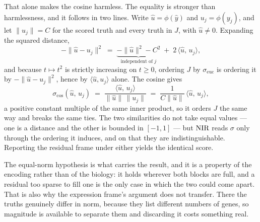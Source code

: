 That alone makes the cosine harmless. The equality is stronger than harmlessness,
and it follows in two lines. Write $\hat{u} = \phi(\hat{y})$ and $u_j =
\phi(y_j)$, and let $\lVert u_j \rVert = C$ for the scored truth and every truth
in $J$, with $\hat{u} \neq 0$. Expanding the squared distance,
\begin{equation}
 -\lVert \hat{u} - u_j \rVert^{2}
 \;=\; \underbrace{-\lVert \hat{u} \rVert^{2} - C^{2}}_{\text{independent of } j}
 \;+\; 2\,\langle \hat{u},\, u_j \rangle ,
\end{equation}
and because $t \mapsto t^{2}$ is strictly increasing on $t \geq 0$, ordering $J$
by $\sigma_{\mathrm{euc}}$ is ordering it by $-\lVert \hat{u} - u_j \rVert^{2}$,
hence by $\langle \hat{u}, u_j \rangle$ alone. The cosine gives
\begin{equation}
 \sigma_{\cos}(\hat{u},\, u_j)
 \;=\; \frac{\langle \hat{u},\, u_j \rangle}
            {\lVert \hat{u} \rVert \, \lVert u_j \rVert}
 \;=\; \frac{1}{C \lVert \hat{u} \rVert}\,\langle \hat{u},\, u_j \rangle ,
\end{equation}
a positive constant multiple of the same inner product, so it orders $J$ the same
way and breaks the same ties. The two similarities do not take equal values ---
one is a distance and the other is bounded in $[-1, 1]$ --- but $\textrm{NIR}$ reads
$\sigma$ only through the ordering it induces, and on that they are
indistinguishable. Reporting the residual frame under either yields the identical
score.

The equal-norm hypothesis is what carries the result, and it is a property of the
encoding rather than of the biology: it holds wherever both blocks are full, and a
residual too sparse to fill one is the only case in which the two could come
apart. That is also why the expression frame's argument does not transfer.
There the truths genuinely differ in norm, because they list different numbers of
genes, so magnitude is available to separate them and discarding it costs
something real.


